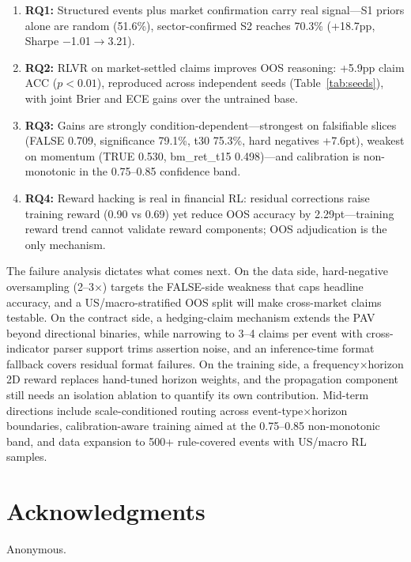 \documentclass[sigconf, anonymous, review]{acmart}
\begin{document}
\begin{enumerate}
    \item \textbf{RQ1:} Structured events plus market confirmation carry real signal---S1 priors alone are random (51.6\%), sector-confirmed S2 reaches 70.3\% (+18.7pp, Sharpe $-$1.01$\to$3.21).
    \item \textbf{RQ2:} RLVR on market-settled claims improves OOS reasoning: +5.9pp claim ACC ($p<0.01$), reproduced across independent seeds (Table~\ref{tab:seeds}), with joint Brier and ECE gains over the untrained base.
    \item \textbf{RQ3:} Gains are strongly condition-dependent---strongest on falsifiable slices (FALSE 0.709, significance 79.1\%, t30 75.3\%, hard negatives +7.6pt), weakest on momentum (TRUE 0.530, bm\_ret\_t15 0.498)---and calibration is non-monotonic in the 0.75--0.85 confidence band.
    \item \textbf{RQ4:} Reward hacking is real in financial RL: residual corrections raise training reward (0.90 vs 0.69) yet reduce OOS accuracy by 2.29pt---training reward trend cannot validate reward components; OOS adjudication is the only mechanism.
\end{enumerate}

The failure analysis dictates what comes next. On the data side, hard-negative oversampling (2--3$\times$) targets the FALSE-side weakness that caps headline accuracy, and a US/macro-stratified OOS split will make cross-market claims testable. On the contract side, a hedging-claim mechanism extends the PAV beyond directional binaries, while narrowing to 3--4 claims per event with cross-indicator parser support trims assertion noise, and an inference-time format fallback covers residual format failures. On the training side, a frequency$\times$horizon 2D reward replaces hand-tuned horizon weights, and the propagation component still needs an isolation ablation to quantify its own contribution. Mid-term directions include scale-conditioned routing across event-type$\times$horizon boundaries, calibration-aware training aimed at the 0.75--0.85 non-monotonic band, and data expansion to 500+ rule-covered events with US/macro RL samples.

\section*{Acknowledgments}

Anonymous.
\end{document}
